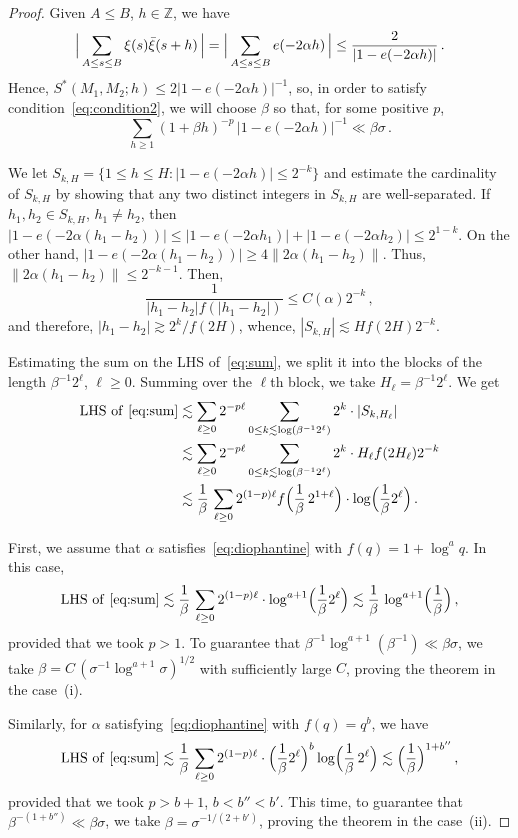 \documentclass[11pt]{amsart}
\numberwithin{equation}{section}
\newcommand{\bZ}{\mathbb Z}
\begin{document}
\begin{proof}
Given $A\le B$, $h\in\bZ$, we have
\[
\Bigl|\,
\sum_{A\le s \le B} \xi (s) \bar\xi(s+h) \, \Bigr|
= \Bigl|\,
\sum_{A\le s \le B} e(-2\alpha h) \, \Bigr| \le \frac2{|1-e(-2\alpha h)|}\,.
\]
Hence, $S^*(M_1, M_2; h) \le 2|1-e(-2\alpha h)|^{-1}$, so, in order to satisfy
condition~\eqref{eq:condition2}, we will choose $\beta$ so that, for some positive $p$,
\begin{equation}\label{eq:sum}
\sum_{h\ge 1} (1+\beta h)^{-p}\, |1-e(-2\alpha h)|^{-1}
\ll \beta\sigma\,.
\end{equation}

We let $S_{k, H} = \{1\le h \le H\colon |1-e(-2\alpha h)| \le 2^{-k}\}$ and estimate the
cardinality of $S_{k, H}$ by showing that any two distinct integers in $S_{k, H}$ are
well-separated. If $h_1, h_2\in S_{k, H}$, $h_1\ne h_2$, then
$|1-e(-2\alpha (h_1-h_2))| \le |1-e(-2\alpha h_1)| +  |1-e(-2\alpha h_2)| \le 2^{1-k}$.
On the other hand, $|1-e(-2\alpha (h_1-h_2))|\ge 4\| 2\alpha (h_1-h_2)\|$.
Thus, $ \| 2\alpha (h_1-h_2)\| \le 2^{-k-1}$. Then,
\[
\frac1{|h_1-h_2|f(|h_1-h_2|)} \le C(\alpha) 2^{-k}\,,
\]
and therefore, $|h_1-h_2| \gtrsim 2^k/f(2H)$, whence, $|S_{k, H}|\lesssim Hf(2H)2^{-k}$.

Estimating the sum on the LHS of~\eqref{eq:sum}, we split it into the blocks of the length $\beta^{-1}2^\ell$, $\ell\ge 0$. Summing over the $\ell$th block, we take $H_\ell = \beta^{-1}2^\ell$.
We get
\begin{align*}
{\rm LHS\ of\ }\eqref{eq:sum} &\lesssim
\sum_{\ell\ge 0} 2^{-p\ell}
\sum_{0\le k \lesssim \log(\beta^{-1} 2^\ell)} 2^k \cdot
|S_{k, H_\ell}| \\
&\lesssim
\sum_{\ell\ge 0} 2^{-p\ell}
\sum_{0\le k \lesssim \log(\beta^{-1} 2^\ell)} 2^k \cdot H_\ell f(2H_\ell) 2^{-k} \\
&\lesssim
\frac1\beta\, \sum_{\ell\ge 0} 2^{(1-p)\ell} f\Bigl( \frac1\beta\, 2^{1+\ell} \Bigr)
\cdot \log\Bigl( \frac1{\beta} 2^\ell \Bigr)\,.
\end{align*}

First, we assume that $\alpha$ satisfies~\eqref{eq:diophantine} with  $f(q)=1+\log^a q$.
In this case,
\[
{\rm LHS\ of\ }\eqref{eq:sum} \lesssim
\frac1\beta\, \sum_{\ell\ge 0} 2^{(1-p)\ell} \cdot \log^{a+1}\Bigl( \frac1{\beta} 2^\ell \Bigr)
\lesssim \frac1\beta\, \log^{a+1}\Bigl( \frac1{\beta} \Bigr)\,,
\]
provided that we took $p>1$. To guarantee that $\beta^{-1} \log^{a+1}(\beta^{-1}) \ll \beta\sigma$,
we take $\beta = C\, (\sigma^{-1}\log^{a+1}\sigma)^{1/2}$
with sufficiently large $C$, proving the theorem in the case~(i).

Similarly, for $\alpha$ satisfying~\eqref{eq:diophantine} with  $f(q)=q^b$,
we have
\[
{\rm LHS\ of\ }\eqref{eq:sum} \lesssim
\frac1\beta\, \sum_{\ell\ge 0} 2^{(1-p)\ell} \cdot \Bigl( \frac1{\beta} 2^\ell \Bigr)^b
\log\Bigl( \frac1{\beta}\, 2^\ell \Bigr)
\lesssim \Bigl( \frac1{\beta} \Bigr)^{1+b''}\,,
\]
provided that we took $p>b+1$, $b<b''<b'$. This time, to guarantee that
$\beta^{-(1+b'')} \ll \beta\sigma$, we take $\beta  =\sigma^{-1/(2+b')}$,
proving the theorem in the case~(ii).
\end{proof}
\end{document}
